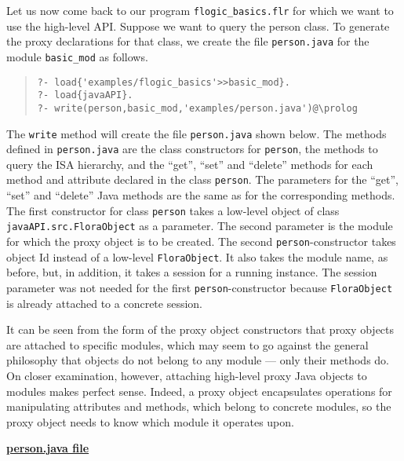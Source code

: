 Let us now come back to our program {\tt flogic\_basics.flr} for which we
want to use the high-level API.  Suppose we want to query the person class.
To generate the proxy declarations for that class, we create
the file {\tt person.java} for the 
module {\tt basic\_mod} as follows.
\begin{quote}
\begin{verbatim}
?- load{'examples/flogic_basics'>>basic_mod}.
?- load{javaAPI}.
?- write(person,basic_mod,'examples/person.java')@\prolog
\end{verbatim}
\end{quote}


The {\tt write} method will create the file {\tt person.java} shown
below.  The methods defined in {\tt person.java} are the class constructors
for {\tt person}, the methods to query the ISA hierarchy, and the ``get'',
``set'' and ``delete'' methods for each method and attribute declared in
the \FLSYSTEM class {\tt person}.  The parameters for the ``get'', ``set'' and
``delete'' Java methods are the same as for the corresponding \FLSYSTEM
methods. The first constructor for class {\tt person} takes a low-level
object of class {\tt javaAPI.src.FloraObject} as a
parameter. The second parameter is the \FLSYSTEM module for which the proxy
object is to be created.
The second {\tt person}-constructor takes \fl object Id instead of a
low-level {\tt FloraObject}. It also takes the module name, as before, but,
in addition, it takes a session for a running \FLSYSTEM instance.
The session parameter was not needed for the first {\tt person}-constructor
because {\tt FloraObject} is already attached to a concrete session.  

It can be seen from the form of the proxy object constructors that
proxy objects are attached to specific \FLSYSTEM modules, which may seem to
go against the general philosophy that \fl objects do not belong to any
module --- only their methods do. On closer examination, however, attaching
high-level proxy Java objects to modules makes perfect sense. Indeed, a
proxy object encapsulates operations for manipulating \fl attributes 
and methods, which belong to concrete \FLSYSTEM modules, so the proxy object
needs to know which module it operates upon.


\underline{{\bf person.java file}}

